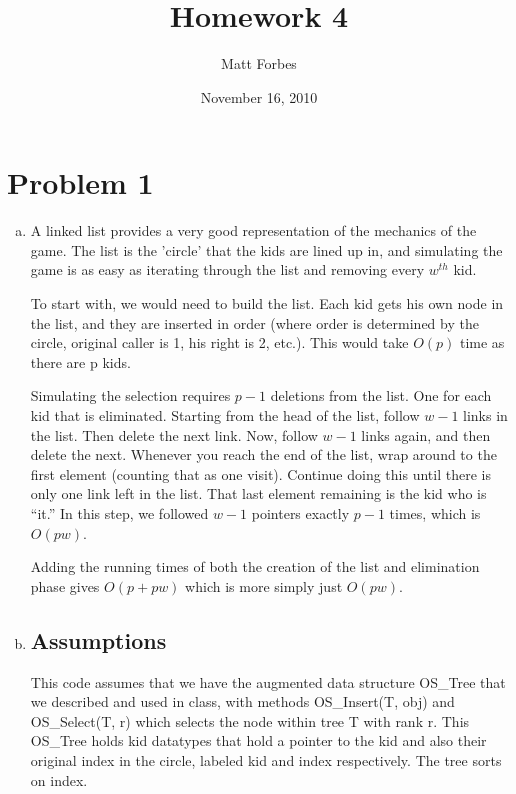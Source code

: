 \documentclass[a4paper,12pt]{article}
\begin{document}
\title{Homework 4}
\author{Matt Forbes}
\date{November 16, 2010}
\maketitle

\section*{Problem 1}


\begin{enumerate}[a)]
  \item

    A linked list provides a very good representation of the mechanics
    of the game. The list is the 'circle' that the kids are lined up
    in, and simulating the game is as easy as iterating through the
    list and removing every $w^{th}$ kid.

    To start with, we would need to build the list. Each kid gets his
    own node in the list, and they are inserted in order (where order
    is determined by the circle, original caller is 1, his right is 2,
    etc.). This would take $O(p)$ time as there are p kids.

    Simulating the selection requires $p-1$ deletions from the
    list. One for each kid that is eliminated. Starting from the head
    of the list, follow $w-1$ links in the list. Then delete the next
    link. Now, follow $w-1$ links again, and then delete the
    next. Whenever you reach the end of the list, wrap around to the
    first element (counting that as one visit). Continue doing this
    until there is only one link left in the list. That last element
    remaining is the kid who is ``it.'' In this step, we followed
    $w-1$ pointers exactly $p-1$ times, which is $O(pw)$.

    Adding the running times of both the creation of the list and
    elimination phase gives $O(p + pw)$ which is more simply just
    $O(pw)$. 

  \item
    
\subsection*{Assumptions}

    This code assumes that we have the augmented data structure
    OS\_Tree that we described and used in class, with methods
    OS\_Insert(T, obj) and OS\_Select(T, r) which selects the node
    within tree T with rank r. This OS\_Tree holds kid datatypes that
    hold a pointer to the kid and also their original index in the
    circle, labeled kid and index respectively. The tree sorts on
    index.
    

\end{enumerate}
\end{document}
